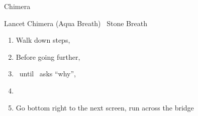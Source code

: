 \begin{battle}{Chimera}
	\begin{itemize}
		\kimahrif Lancet Chimera (Aqua Breath)
		\kimahrif \od\ Stone Breath
	\end{itemize}
\end{battle}
\winvfill
\begin{enumerate}[resume]
	\item Walk down steps, \cs[1:30]
	\item Before going further, 
	\item \sd\ until \tidus\ asks ``why'', \cs[6:20]
	\item \formation{\tidus}{\rikku}{\kimahri}
	\item Go bottom right to the next screen, run across the bridge
\end{enumerate}